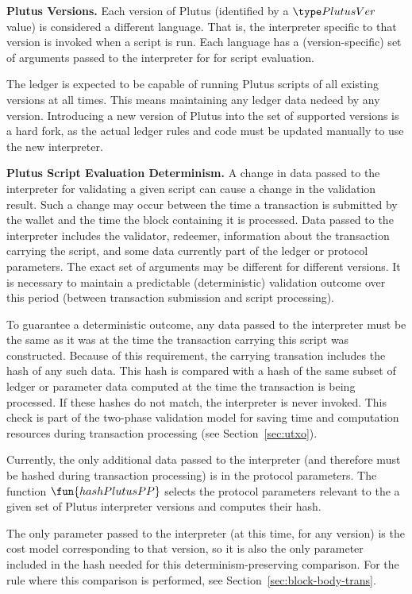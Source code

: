 \textbf{Plutus Versions.} Each
version of Plutus (identified by a $\PlutusVer$ value) is considered a different
language. That is, the interpreter
specific to that version is invoked when a script is run. Each language
has a (version-specific) set of arguments passed to the interpreter for
for script evaluation.

The ledger is expected to be capable of running Plutus scripts of
all existing versions at all times. This means maintaining any ledger
data nedeed by any version. Introducing a new version of Plutus
into the set of supported versions is a hard fork, as the actual ledger rules
and code must be updated manually to use the new interpreter.

\textbf{Plutus Script Evaluation Determinism.}
A change in data passed to the interpreter for
validating a given script can cause a change in the validation result. Such
a change may occur between the time a transaction is submitted by the wallet
and the time the block containing it is processed. Data passed to the interpreter
includes the validator, redeemer, information about the transaction carrying
the script, and some data currently part of the ledger or protocol parameters.
The exact set of arguments may be different for different versions.
It is necessary to maintain a predictable
(deterministic) validation outcome over this period (between transaction
submission and script processing).

To guarantee a deterministic outcome,
any data passed to the interpreter must be
the same as it was at the time the transaction carrying this script was
constructed.
Because of this requirement, the carrying transation includes the hash of any such data.
This hash is compared with
a hash of the same subset of ledger or parameter data computed at the time the transaction is being
processed. If these hashes do not match, the interpreter is never invoked.
This check is part of the two-phase validation model for saving time and computation
resources during transaction processing (see Section~\ref{sec:utxo}).

Currently, the only additional data passed to the interpreter (and therefore must
be hashed during transaction processing) is in the protocol parameters. The
function $\fun{hashPlutusPP}$ selects the protocol parameters relevant to
the a given set of Plutus interpreter versions and computes their hash.

The only parameter passed to the interpreter (at this time, for any version) is the cost model
corresponding to that version, so it is also the only parameter included
in the hash needed for this determinism-preserving comparison. For the rule
where this comparison is performed, see Section~\ref{sec:block-body-trans}.

